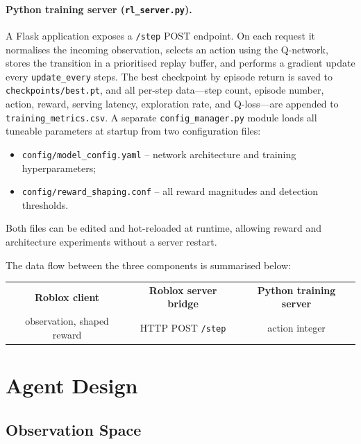 \documentclass[11pt]{article}
\begin{document}
\paragraph{Python training server (\texttt{rl\_server.py}).}
A Flask application exposes a \texttt{/step} POST endpoint. On each
request it normalises the incoming observation, selects an action using
the Q-network, stores the transition in a prioritised replay buffer, and
performs a gradient update every \texttt{update\_every} steps. The best
checkpoint by episode return is saved to \texttt{checkpoints/best.pt},
and all per-step data---step count, episode number, action, reward,
serving latency, exploration rate, and Q-loss---are appended to
\texttt{training\_metrics.csv}. A separate \texttt{config\_manager.py}
module loads all tuneable parameters at startup from two configuration
files:
\begin{itemize}
  \item \texttt{config/model\_config.yaml} -- network architecture and
    training hyperparameters;
  \item \texttt{config/reward\_shaping.conf} -- all reward magnitudes and
    detection thresholds.
\end{itemize}
Both files can be edited and hot-reloaded at runtime, allowing reward and
architecture experiments without a server restart.

The data flow between the three components is summarised below:

\begin{center}
\renewcommand{\arraystretch}{1.3}
\small
\begin{tabular}{@{}c@{\quad$\longrightarrow$\quad}c@{\quad$\longrightarrow$\quad}c@{}}
  \textbf{Roblox client} & \textbf{Roblox server bridge} &
  \textbf{Python training server} \\
  observation, shaped reward & HTTP POST \texttt{/step} & action integer \\
\end{tabular}
\end{center}

\section{Agent Design}
\label{sec:agent}

\subsection{Observation Space}
\end{document}
